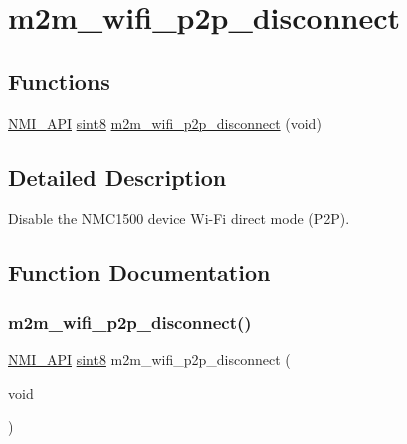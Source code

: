 \hypertarget{group__WifiP2PDisconnectFn}{}\section{m2m\+\_\+wifi\+\_\+p2p\+\_\+disconnect}
\label{group__WifiP2PDisconnectFn}
\subsection*{Functions}
\begin{DoxyCompactItemize}
\item 
\hyperlink{group__BSPDefine_gaecc0323d771e41ef81a76b5f12783e22}{N\+M\+I\+\_\+\+A\+PI} \hyperlink{group__DataT_gae35f10ffd0ac8dd2bc3e794da9bdfbc7}{sint8} \hyperlink{group__WifiP2PDisconnectFn_ga461b81d9e3c60433906384c791398cd4}{m2m\+\_\+wifi\+\_\+p2p\+\_\+disconnect} (void)
\end{DoxyCompactItemize}


\subsection{Detailed Description}
Disable the N\+M\+C1500 device Wi-\/\+Fi direct mode (P2P). 

\subsection{Function Documentation}
\mbox{\label{group__WifiP2PDisconnectFn_ga461b81d9e3c60433906384c791398cd4}} 
\subsubsection{\texorpdfstring{m2m\+\_\+wifi\+\_\+p2p\+\_\+disconnect()}{m2m\_wifi\_p2p\_disconnect()}}
{\footnotesize\ttfamily \hyperlink{group__BSPDefine_gaecc0323d771e41ef81a76b5f12783e22}{N\+M\+I\+\_\+\+A\+PI} \hyperlink{group__DataT_gae35f10ffd0ac8dd2bc3e794da9bdfbc7}{sint8} m2m\+\_\+wifi\+\_\+p2p\+\_\+disconnect (\begin{DoxyParamCaption}\item[{void}]{ }\end{DoxyParamCaption})}



